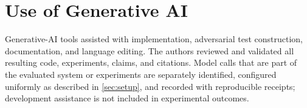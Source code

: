 \documentclass[acmsmall,screen,review,anonymous]{acmart}
\begin{document}
\section*{Use of Generative AI}
Generative-AI tools assisted with implementation, adversarial test construction,
documentation, and language editing. The authors reviewed and validated all resulting
code, experiments, claims, and citations. Model calls that are part of the evaluated
system or experiments are separately identified, configured uniformly as described in
\cref{sec:setup}, and recorded with reproducible receipts; development assistance is not
included in experimental outcomes.



\end{document}

